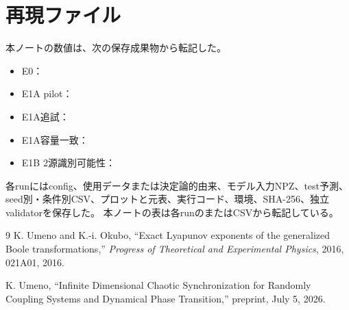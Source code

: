 \documentclass[a4paper,11pt]{jlreq}
\begin{document}
\section{再現ファイル}

本ノートの数値は、次の保存成果物から転記した。

\begin{itemize}
    \item E0：
    \item E1A pilot：
    \item E1A追試：
    \item E1A容量一致：
    \item E1B 2源識別可能性：
\end{itemize}

各runにはconfig、使用データまたは決定論的由来、モデル入力NPZ、test予測、
seed別・条件別CSV、プロットと元表、実行コード、環境、SHA-256、独立validatorを保存した。
本ノートの表は各runのまたはCSVから転記している。

\begin{thebibliography}{9}
K. Umeno and K.-i. Okubo,
``Exact Lyapunov exponents of the generalized Boole transformations,''
\textit{Progress of Theoretical and Experimental Physics}, 2016, 021A01, 2016.

K. Umeno,
``Infinite Dimensional Chaotic Synchronization for Randomly Coupling Systems and Dynamical Phase Transition,''
preprint, July 5, 2026.
\end{thebibliography}
\end{document}
